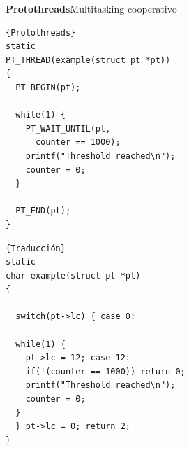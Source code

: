 \documentclass[11pt]{beamer}
\begin{document}
\begin{frame}[fragile]{\textbf{\LARGE{Protothreads}}}{Multitasking cooperativo}
	\vspace{-.6cm}
  \begin{minipage}{.5\textwidth}
    \begin{lstlisting}[frame=tlrb,basicstyle=\footnotesize,label={lst:proto1}]{Protothreads}
static
PT_THREAD(example(struct pt *pt))
{
  PT_BEGIN(pt);
  
  while(1) {
    PT_WAIT_UNTIL(pt,
      counter == 1000);
    printf("Threshold reached\n");
    counter = 0;
  }
  
  PT_END(pt);
}
    \end{lstlisting}
  \end{minipage}\hfill
  \begin{minipage}{.5\textwidth}
    \begin{lstlisting}[frame=tlrb,basicstyle=\footnotesize,label={lst:proto2}]{Traducción}
static
char example(struct pt *pt)
{
  
  switch(pt->lc) { case 0:
 
  while(1) {
    pt->lc = 12; case 12:
    if(!(counter == 1000)) return 0;
    printf("Threshold reached\n");
    counter = 0;
  }
  } pt->lc = 0; return 2;
}
    \end{lstlisting}
  \end{minipage}
\end{frame}
\end{document}
